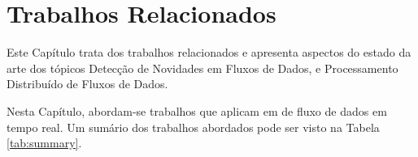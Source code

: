\chapter{Trabalhos Relacionados}\label{cha:related}




Este Capítulo trata dos trabalhos relacionados e apresenta aspectos do estado da arte
dos tópicos Detecção de Novidades em Fluxos de Dados, e
Processamento Distribuído de Fluxos de Dados.


Nesta Capítulo, abordam-se trabalhos que aplicam  em  de fluxo de dados em tempo
real.
Um sumário dos trabalhos abordados pode ser visto na Tabela \ref{tab:summary}.

\newcommand{\kafka}{\emph{Apache Kafka}\xspace}
\newcommand{\spark}{\emph{Apache Spark}\xspace}
\newcommand{\python}{\emph{Python}\xspace}

